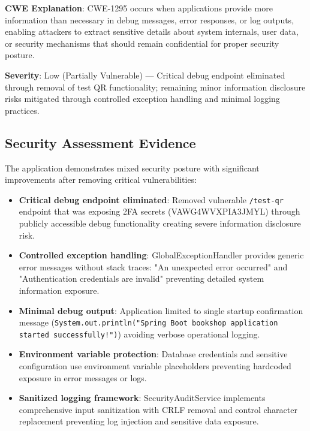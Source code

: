 \documentclass[]{UCD_CS_FYP_Report}
\begin{document}
\textbf{CWE Explanation}: CWE-1295 occurs when applications provide more information than necessary in debug messages, error responses, or log outputs, enabling attackers to extract sensitive details about system internals, user data, or security mechanisms that should remain confidential for proper security posture.

\textbf{Severity}: Low (Partially Vulnerable) — Critical debug endpoint eliminated through removal of test QR functionality; remaining minor information disclosure risks mitigated through controlled exception handling and minimal logging practices.

\subsection{Security Assessment Evidence}
The application demonstrates mixed security posture with significant improvements after removing critical vulnerabilities:
\begin{itemize}
	\item \textbf{Critical debug endpoint eliminated}: Removed vulnerable \texttt{/test-qr} endpoint that was exposing 2FA secrets (VAWG4WVXPIA3JMYL) through publicly accessible debug functionality creating severe information disclosure risk.
	\item \textbf{Controlled exception handling}: GlobalExceptionHandler provides generic error messages without stack traces: "An unexpected error occurred" and "Authentication credentials are invalid" preventing detailed system information exposure.
	\item \textbf{Minimal debug output}: Application limited to single startup confirmation message (\texttt{System.out.println("Spring Boot bookshop application started successfully!")}) avoiding verbose operational logging.
	\item \textbf{Environment variable protection}: Database credentials and sensitive configuration use environment variable placeholders preventing hardcoded exposure in error messages or logs.
	\item \textbf{Sanitized logging framework}: SecurityAuditService implements comprehensive input sanitization with CRLF removal and control character replacement preventing log injection and sensitive data exposure.
\end{itemize}
\end{document}
